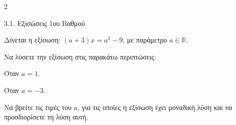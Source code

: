 \begin{ylh}{2}
    \item 3.1. Εξισώσεις 1ου Βαθμού
\end{ylh}
Δίνεται η εξίσωση: $(a + 3)x = a^2 - 9$, με παράμετρο $a \in \mathbb{R}$.
\begin{alist}
\item Να λύσετε την εξίσωση στις παρακάτω περιπτώσεις:
\begin{rlist}
\item Όταν $a = 1$. 
\item Όταν $a = -3$. 
\end{rlist}
\item Να βρείτε τις τιμές του $a$, για τις οποίες η εξίσωση έχει μοναδική λύση και να προσδιορίσετε τη λύση αυτή. 
\end{alist}

